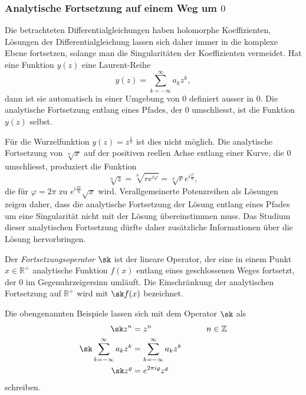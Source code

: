 \subsubsection{Analytische Fortsetzung auf einem Weg um $0$}
Die betrachteten Differentialgleichungen haben holomorphe
Koeffizienten, Lösungen der Differentialgleichung lassen sich
daher immer in die komplexe Ebene fortsetzen, solange man die
Singularitäten der Koeffizienten vermeidet.
Hat eine Funktion $y(z)$ eine Laurent-Reihe
\[
y(z) = \sum_{k=-\infty}^\infty a_kz^k,
\]
dann ist sie automatisch in einer Umgebung von $0$ definiert
ausser in $0$.
Die analytische Fortsetzung entlang eines Pfades, der $0$
umschliesst, ist die Funktion $y(z)$ selbst.

Für die Wurzelfunktion $y(z)=z^{\frac1n}$ ist dies nicht möglich.
Die analytische Fortsetzung von $\sqrt[n]{x}$ auf der positiven reellen
Achse entlang einer Kurve, die $0$ umschliesst,
produziert die Funktion
\[
\sqrt[n]{z}
=
\sqrt[n]{re^{i\varphi}}
=
\sqrt[n]{r}e^{i\frac{\varphi}n},
\]
die für $\varphi=2\pi$ zu $e^{i\frac{2\pi}n}\sqrt{x}$ wird.
Verallgemeinerte Potenzreihen als Lösungen zeigen daher, dass
die analytische Fortsetzung der Lösung entlang eines Pfades um
eine Singularität nicht mit der Lösung übereinstimmen muss.
Das Studium dieser analytischen Fortsetzung dürfte daher zusätzliche
Informationen über die Lösung hervorbringen.

\begin{definition}
Der {\em Fortsetzungsoperator} $\sk$ ist der lineare Operator, der eine
in einem Punkt $x\in\mathbb{R}^+$ analytische Funktion $f(x)$ entlang eines
geschlossenen Weges fortsetzt, der $0$ im Gegenuhrzeigersinn umläuft.
Die Einschränkung der analytischen Fortsetzung auf $\mathbb{R}^+$ wird
mit $\sk f(x)$ bezeichnet.
\end{definition}

Die obengenannten Beispiele lassen sich mit dem Operator $\sk$ als
\[
\begin{aligned}
\sk z^n
&=
z^n
&\qquad& n \in \mathbb{Z}
\\
\sk
\sum_{k=-\infty}^\infty a_kz^k
&=
\sum_{k=-\infty}^\infty a_kz^k
\\
\sk z^\varrho
&=
e^{2\pi i\varrho} z^\varrho
\end{aligned}
\]
schreiben.

